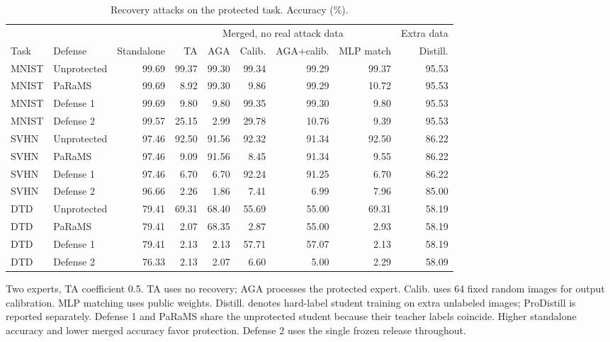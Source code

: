 \begin{table}[t]
\centering\small
\setlength{\tabcolsep}{4pt}
\caption{Recovery attacks on the protected task. Accuracy (\%).}
\label{tab:attacks}
\begin{tabular}{@{}llrrrrrrr@{}}
\toprule
 &  &  & \multicolumn{5}{c}{Merged, no real attack data} & Extra data \\
\cmidrule(lr){4-8}\cmidrule(lr){9-9}
Task & Defense & Standalone & TA & AGA & Calib. & AGA+calib. & MLP match & Distill. \\
\midrule
MNIST & Unprotected & 99.69 & 99.37 & 99.30 & 99.34 & 99.29 & 99.37 & 95.53 \\
MNIST & PaRaMS & 99.69 & 8.92 & 99.30 & 9.86 & 99.29 & 10.72 & 95.53 \\
MNIST & Defense 1 & 99.69 & 9.80 & 9.80 & 99.35 & 99.30 & 9.80 & 95.53 \\
MNIST & Defense 2 & 99.57 & 25.15 & 2.99 & 29.78 & 10.76 & 9.39 & 95.53 \\
\midrule
SVHN & Unprotected & 97.46 & 92.50 & 91.56 & 92.32 & 91.34 & 92.50 & 86.22 \\
SVHN & PaRaMS & 97.46 & 9.09 & 91.56 & 8.45 & 91.34 & 9.55 & 86.22 \\
SVHN & Defense 1 & 97.46 & 6.70 & 6.70 & 92.24 & 91.25 & 6.70 & 86.22 \\
SVHN & Defense 2 & 96.66 & 2.26 & 1.86 & 7.41 & 6.99 & 7.96 & 85.00 \\
\midrule
DTD & Unprotected & 79.41 & 69.31 & 68.40 & 55.69 & 55.00 & 69.31 & 58.19 \\
DTD & PaRaMS & 79.41 & 2.07 & 68.35 & 2.87 & 55.00 & 2.93 & 58.19 \\
DTD & Defense 1 & 79.41 & 2.13 & 2.13 & 57.71 & 57.07 & 2.13 & 58.19 \\
DTD & Defense 2 & 76.33 & 2.13 & 2.07 & 6.60 & 5.00 & 2.29 & 58.09 \\
\bottomrule
\end{tabular}
\par\smallskip
\begin{minipage}{\textwidth}\footnotesize Two experts, TA coefficient 0.5. TA uses no recovery; AGA processes the protected expert. Calib. uses 64 fixed random images for output calibration. MLP matching uses public weights. Distill. denotes hard-label student training on extra unlabeled images; ProDistill is reported separately. Defense 1 and PaRaMS share the unprotected student because their teacher labels coincide. Higher standalone accuracy and lower merged accuracy favor protection. Defense 2 uses the single frozen release throughout.\end{minipage}
\end{table}
